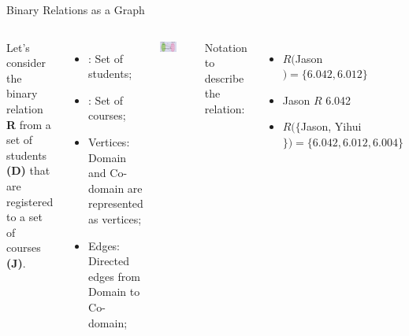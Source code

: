 \begin{frame}[t]{Binary Relations as a Graph}

  \begin{columns}[t]
    Let's consider the binary relation {\bf R} from a set of students {\bf (D)} that are registered to a set of courses {\bf (J)}.\bigskip

    \begin{itemize}
    \item {}: Set of students;
    \item {}: Set of courses;
    \item \alert{Vertices:} Domain and Co-domain are represented as vertices;
    \item \alert{Edges:} Directed edges from Domain to Co-domain;
    \end{itemize}\bigskip


    \begin{center}
      \includegraphics[width=0.6\textwidth]{../img/relations}
    \end{center}
    Notation to describe the relation:
    \begin{itemize}
    \item $R($Jason$) = \{6.042, 6.012\}$
    \item Jason $R$ 6.042
    \item $R(\{$Jason, Yihui$\}) = \{6.042, 6.012, 6.004\}$
    \end{itemize}
  \end{columns}
\end{frame}


